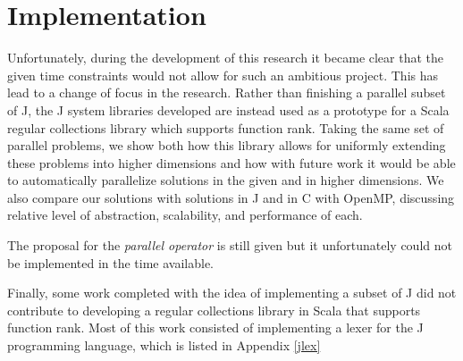 \section{Implementation}
\label{imp}
Unfortunately, during the development of this research it became clear that the given time constraints would not allow for such an ambitious project.
This has lead to a change of focus in the research. 
Rather than finishing a parallel subset of J, the J system libraries developed 
are instead used as a prototype for a Scala regular collections library which supports function rank.
Taking the same set of parallel problems, we show both how this library allows for uniformly extending these problems into higher dimensions and 
how with future work it would be able to automatically parallelize solutions in the given and in higher dimensions.
We also compare our solutions with solutions in J and in C with OpenMP, discussing relative level of abstraction, scalability, and performance of each.

The proposal for the \textit{parallel operator} is still given but it unfortunately could not be implemented in the time available.

Finally, some work completed with the idea of implementing a subset of J did not contribute to developing a regular collections library in Scala that supports function rank.
Most of this work consisted of implementing a lexer for the J programming language, which is listed in Appendix \ref{jlex}
